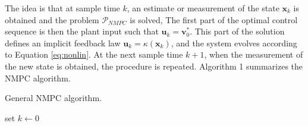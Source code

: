 \par
The idea is that at sample time $k$, an estimate or measurement of the state $\boldsymbol{x}_k$ is obtained and the problem $\mathcal{P}_{NMPC}$ is solved,
The first part of the optimal control sequence is then the plant input such that $\boldsymbol{u}_k=\boldsymbol{v}_0^*$.
This part of the solution defines an implicit feedback law $\boldsymbol{u}_k=\kappa(\boldsymbol{x}_k)$, and the system evolves according to Equation \ref{eq:nonlin}.
At the next sample time $k+1$, when the measurement of the new state is obtained, the procedure is repeated.
Algorithm 1 summarizes the NMPC algorithm.\\
\begin{algorithm}[H]
 \caption{General NMPC algorithm.}
	\SetAlgoLined
	set $k\leftarrow 0$\\
\end{algorithm}
